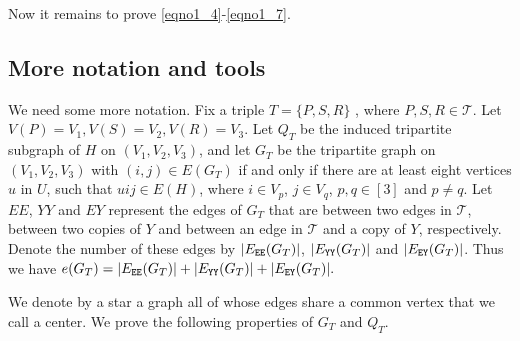 \documentclass[11pt, reqno]{amsart}    	%
\theoremstyle{definition}
\def\cT{\mathcal T}
\numberwithin{equation}{section}
\begin{document}
	Now it remains to prove \eqref{eqno1_4}-\eqref{eqno1_7}.
	
	
	\def\EE{\tt EE}
	\def\EY{\tt EY}
	\def\YY{\tt YY}
	
	\subsection{More notation and tools}
	We need some more notation.
	Fix a triple $T=\{ P,S,R\}$ , where $P,S,R\in \cT$. Let $V(P)=V_{1},V(S)=V_{2},V(R)=V_{3} $. Let $Q_{T}$ be the  induced tripartite subgraph of $H$  on $(V_{1},V_{2},V_{3}) $, and let $G_{T}$ be the tripartite graph on $(V_{1},V_{2},V_{3}) $ with $(i, j)\in E(G_T)$ if and only if there are at least eight vertices $u$ in $U$, such that $ uij\in E(H) $, where $i\in V_{p}$, $j\in V_{q}$, $p,q\in[3]$ and $p\neq q$.  Let $EE$, $YY$ and $EY$ represent the edges of $G_T$ that are between two edges in $\cT$, between two copies of $Y$ and between an edge in $\cT$ and a copy of $Y$, respectively.
	Denote the number of these edges by $|E_{\EE}(G_T)|$, $|E_{\YY}(G_T)|$ and $|E_{\EY}(G_T)|$.
	Thus we have $ e(G_T)=|E_{\EE}(G_T)|+|E_{\YY}(G_T)|+|E_{\EY}(G_T)|.$
	
	We denote by a star a graph all of whose edges share a common vertex that we call a center. We prove the following properties of $G_T$ and $Q_T $.
	
\end{document}
